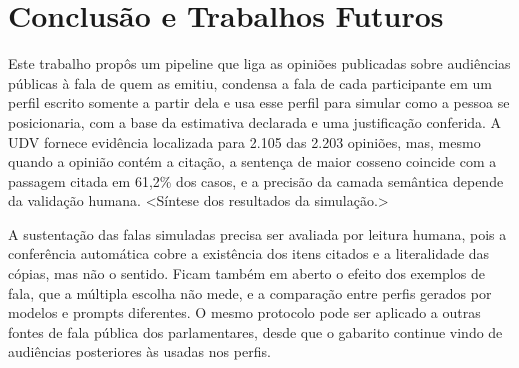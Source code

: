 \section{Conclus\~ao e Trabalhos Futuros}
\label{sec:conclusao}

Este trabalho propôs um pipeline que liga as opiniões publicadas sobre audiências públicas à fala de
quem as emitiu, condensa a fala de cada participante em um perfil escrito somente a partir dela e usa
esse perfil para simular como a pessoa se posicionaria, com a base da estimativa declarada e uma
justificação conferida. A UDV fornece evidência localizada para 2.105 das 2.203 opiniões, mas, mesmo
quando a opinião contém a citação, a sentença de maior cosseno coincide com a passagem citada em
61,2\% dos casos, e a precisão da camada semântica depende da validação humana. <Síntese dos
resultados da simulação.>

A sustentação das falas simuladas precisa ser avaliada por leitura humana, pois a conferência
automática cobre a existência dos itens citados e a literalidade das cópias, mas não o sentido. Ficam
também em aberto o efeito dos exemplos de fala, que a múltipla escolha não mede, e a comparação entre
perfis gerados por modelos e prompts diferentes. O mesmo protocolo pode ser aplicado a outras fontes
de fala pública dos parlamentares, desde que o gabarito continue vindo de audiências posteriores às
usadas nos perfis.
